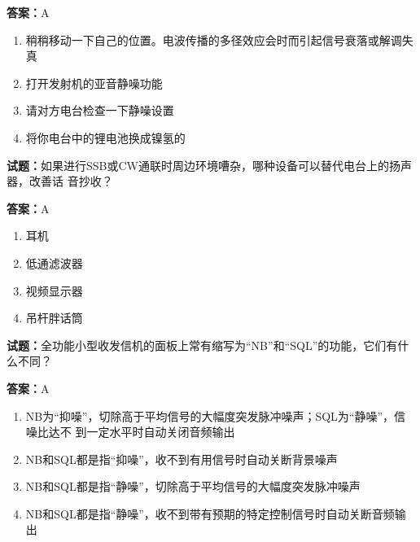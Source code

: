 \documentclass{ctexbook}
\begin{document}
\textbf{答案：}A 

\begin{enumerate}[leftmargin=3em]
  \item 稍稍移动一下自己的位置。电波传播的多径效应会时而引起信号衰落或解调失真 

  \item 打开发射机的亚音静噪功能 

  \item 请对方电台检查一下静噪设置 

  \item 将你电台中的锂电池换成镍氢的 

\end{enumerate}





\vspace{1em}

\textbf{试题：}如果进行SSB或CW通联时周边环境嘈杂，哪种设备可以替代电台上的扬声器，改善话
音抄收？ 

\textbf{答案：}A 

\begin{enumerate}[leftmargin=3em]
  \item 耳机 

  \item 低通滤波器 

  \item 视频显示器 


  \item 吊杆胖话筒 

\end{enumerate}





\vspace{1em}

\textbf{试题：}全功能小型收发信机的面板上常有缩写为“NB”和“SQL”的功能，它们有什么不同？ 

\textbf{答案：}A 

\begin{enumerate}[leftmargin=3em]
  \item NB为“抑噪”，切除高于平均信号的大幅度突发脉冲噪声；SQL为“静噪”，信噪比达不
到一定水平时自动关闭音频输出 

  \item NB和SQL都是指“抑噪”，收不到有用信号时自动关断背景噪声 

  \item NB和SQL都是指“静噪”，切除高于平均信号的大幅度突发脉冲噪声 

  \item NB和SQL都是指“静噪”，收不到带有预期的特定控制信号时自动关断音频输出 

\end{enumerate}
\end{document}
